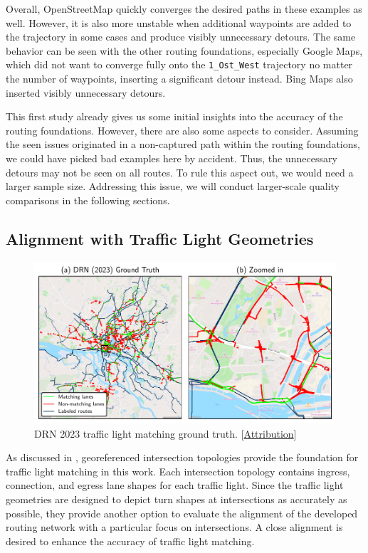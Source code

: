Overall, OpenStreetMap quickly converges the desired paths in these examples as well. However, it is also more unstable when additional waypoints are added to the trajectory in some cases and produce visibly unnecessary detours. The same behavior can be seen with the other routing foundations, especially Google Maps, which did not want to converge fully onto the \texttt{1\_Ost\_West} trajectory no matter the number of waypoints, inserting a significant detour instead. Bing Maps also inserted visibly unnecessary detours. 

This first study already gives us some initial insights into the accuracy of the routing foundations. However, there are also some aspects to consider. Assuming the seen issues originated in a non-captured path within the routing foundations, we could have picked bad examples here by accident. Thus, the unnecessary detours may not be seen on all routes. To rule this aspect out, we would need a larger sample size. Addressing this issue, we will conduct larger-scale quality comparisons in the following sections.

\subsection{Alignment with Traffic Light Geometries}

\begin{figure}[t]
\centering 
\includegraphics[width=\linewidth]{images/matching-ground-truth-drn.pdf}
\caption{DRN 2023 traffic light matching ground truth. [\hyperref[attribution]{Attribution}]}
\label{fig:matching-ground-truth-drn}
\end{figure}

As discussed in , georeferenced intersection topologies provide the foundation for traffic light matching in this work. Each intersection topology contains ingress, connection, and egress lane shapes for each traffic light. Since the traffic light geometries are designed to depict turn shapes at intersections as accurately as possible, they provide another option to evaluate the alignment of the developed routing network with a particular focus on intersections. A close alignment is desired to enhance the accuracy of traffic light matching.

